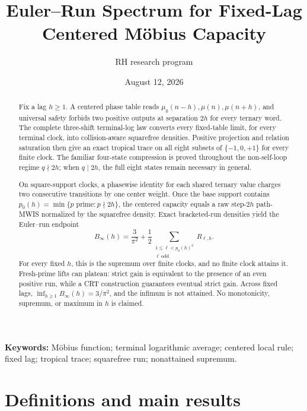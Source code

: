 \documentclass[11pt]{article}
\title{Euler--Run Spectrum for Fixed-Lag Centered M\"obius Capacity}
\author{RH research program}
\date{August 12, 2026}
\theoremstyle{definition}
\theoremstyle{remark}
\newcommand{\mob}{\mu}
\begin{document}
\maketitle

\begin{abstract}
Fix a lag \(h\geq1\).  A centered phase table reads
\(\mob_0(n-h),\mob(n),\mob(n+h)\), and universal safety forbids two
positive outputs at separation \(2h\) for every ternary word.  The
complete three-shift terminal-log law converts every fixed-table limit,
for every terminal clock, into collision-aware squarefree densities.
Positive projection and relation saturation then give an exact tropical
trace on all eight subsets of \(\{-1,0,+1\}\) for every finite clock.
The familiar four-state compression is proved throughout the
non-self-loop regime \(q\nmid2h\); when \(q\mid2h\), the full eight states
remain necessary in general.

On square-support clocks, a phasewise identity for each shared ternary
value charges two consecutive transitions by one center weight.  Once the
base support contains
\(p_0(h)=\min\{p\text{ prime}:p\nmid2h\}\), the centered capacity equals a
raw step-\(2h\) path-MWIS normalized by the squarefree density.  Exact
bracketed-run densities yield the Euler--run endpoint
\[
 B_\infty(h)=\frac{3}{\pi^2}
 +\frac12\sum_{\substack{1\leq\ell<p_0(h)^2\\ \ell\ \mathrm{odd}}}
 R_{\ell,h}.
\]
For every fixed \(h\), this is the supremum over finite clocks, and no
finite clock attains it.  Fresh-prime lifts can plateau: strict gain is
equivalent to the presence of an even positive run, while a CRT
construction guarantees eventual strict gain.  Across fixed lags,
\(\inf_{h\geq1}B_\infty(h)=3/\pi^2\), and the infimum is not attained.
No monotonicity, supremum, or maximum in \(h\) is claimed.
\end{abstract}

\noindent\textbf{Keywords:} M\"obius function; terminal logarithmic
average; centered local rule; fixed lag; tropical trace; squarefree run;
nonattained supremum.

\section{Definitions and main results}
\end{document}
